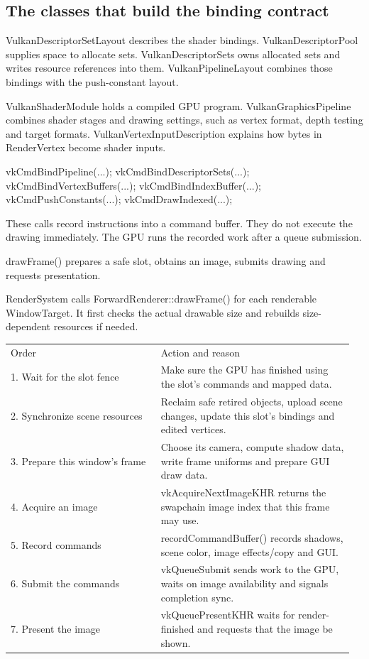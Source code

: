 \documentclass[11pt,a4paper]{article}
\begin{document}
\subsection*{The classes that build the binding contract}
VulkanDescriptorSetLayout describes the shader bindings. VulkanDescriptorPool supplies space to allocate sets. VulkanDescriptorSets owns allocated sets and writes resource references into them. VulkanPipelineLayout combines those bindings with the push-constant layout.

VulkanShaderModule holds a compiled GPU program. VulkanGraphicsPipeline combines shader stages and drawing settings, such as vertex format, depth testing and target formats. VulkanVertexInputDescription explains how bytes in RenderVertex become shader inputs.

vkCmdBindPipeline(...); vkCmdBindDescriptorSets(...); vkCmdBindVertexBuffers(...); vkCmdBindIndexBuffer(...); vkCmdPushConstants(...); vkCmdDrawIndexed(...);

These calls record instructions into a command buffer. They do not execute the drawing immediately. The GPU runs the recorded work after a queue submission.

\label{core-38}
drawFrame() prepares a safe slot, obtains an image, submits drawing and requests presentation.

RenderSystem calls ForwardRenderer::drawFrame() for each renderable WindowTarget. It first checks the actual drawable size and rebuilds size-dependent resources if needed.

{\small
\begin{longtable}{@{}p{0.42\linewidth}p{0.54\linewidth}@{}}
Order & Action and reason \\
1. Wait for the slot fence & Make sure the GPU has finished using the slot's commands and mapped data. \\
2. Synchronize scene resources & Reclaim safe retired objects, upload scene changes, update this slot's bindings and edited vertices. \\
3. Prepare this window's frame & Choose its camera, compute shadow data, write frame uniforms and prepare GUI draw data. \\
4. Acquire an image & vkAcquireNextImageKHR returns the swapchain image index that this frame may use. \\
5. Record commands & recordCommandBuffer() records shadows, scene color, image effects/copy and GUI. \\
6. Submit the commands & vkQueueSubmit sends work to the GPU, waits on image availability and signals completion sync. \\
7. Present the image & vkQueuePresentKHR waits for render-finished and requests that the image be shown. \\
\end{longtable}
}
\end{document}
